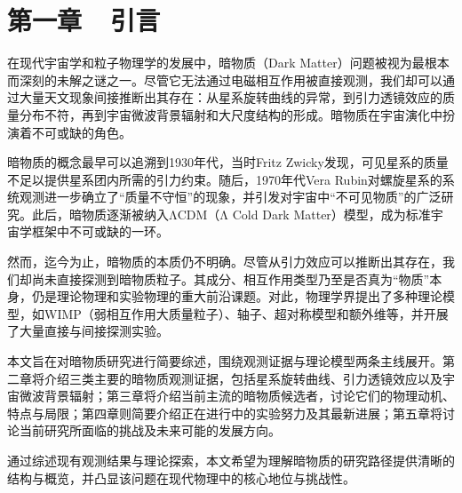 \pagestyle{fancy} %
\setcounter{page}{1} %
\chead{} %
\lfoot{} %
\cfoot{\thepage} %
\rfoot{} %


\section*{第一章~~引言}
\setcounter{section}{1} \setcounter{subsection}{0}

在现代宇宙学和粒子物理学的发展中，暗物质（Dark Matter）问题被视为最根本而深刻的未解之谜之一。尽管它无法通过电磁相互作用被直接观测，我们却可以通过大量天文现象间接推断出其存在：从星系旋转曲线的异常，到引力透镜效应的质量分布不符，再到宇宙微波背景辐射和大尺度结构的形成。暗物质在宇宙演化中扮演着不可或缺的角色。

暗物质的概念最早可以追溯到1930年代，当时Fritz Zwicky发现，可见星系的质量不足以提供星系团内所需的引力约束。随后，1970年代Vera Rubin对螺旋星系的系统观测进一步确立了“质量不守恒”的现象，并引发对宇宙中“不可见物质”的广泛研究。此后，暗物质逐渐被纳入ΛCDM（Λ Cold Dark Matter）模型，成为标准宇宙学框架中不可或缺的一环。\cite{bertone2018history}

然而，迄今为止，暗物质的本质仍不明确。尽管从引力效应可以推断出其存在，我们却尚未直接探测到暗物质粒子。其成分、相互作用类型乃至是否真为“物质”本身，仍是理论物理和实验物理的重大前沿课题。对此，物理学界提出了多种理论模型，如WIMP（弱相互作用大质量粒子）、轴子、超对称模型和额外维等，并开展了大量直接与间接探测实验。

本文旨在对暗物质研究进行简要综述，围绕观测证据与理论模型两条主线展开。第二章将介绍三类主要的暗物质观测证据，包括星系旋转曲线、引力透镜效应以及宇宙微波背景辐射；第三章将介绍当前主流的暗物质候选者，讨论它们的物理动机、特点与局限；第四章则简要介绍正在进行中的实验努力及其最新进展；第五章将讨论当前研究所面临的挑战及未来可能的发展方向。

通过综述现有观测结果与理论探索，本文希望为理解暗物质的研究路径提供清晰的结构与概览，并凸显该问题在现代物理中的核心地位与挑战性。

\newpage


